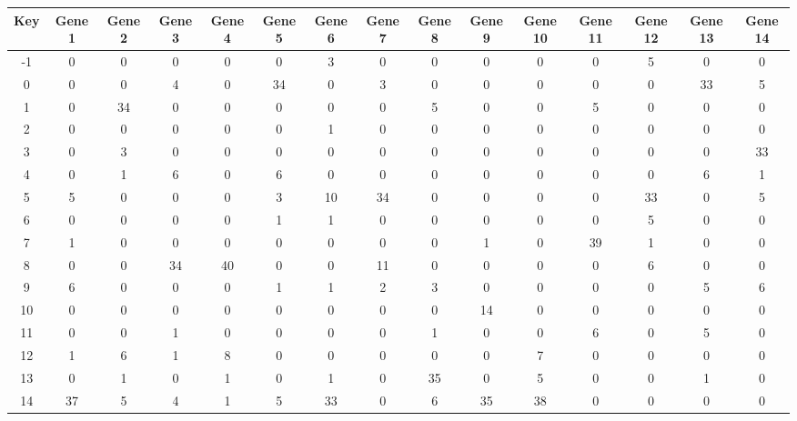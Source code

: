 \begin{tabular}{|c|c|c|c|c|c|c|c|c|c|c|c|c|c|c|}
\hline
Key & Gene 1 & Gene 2 & Gene 3 & Gene 4 & Gene 5 & Gene 6 & Gene 7 & Gene 8 & Gene 9 & Gene 10 & Gene 11 & Gene 12 & Gene 13 & Gene 14 \\
\hline
-1 & 0 & 0 & 0 & 0 & 0 & 3 & 0 & 0 & 0 & 0 & 0 & 5 & 0 & 0 \\
0 & 0 & 0 & 4 & 0 & 34 & 0 & 3 & 0 & 0 & 0 & 0 & 0 & 33 & 5 \\
1 & 0 & 34 & 0 & 0 & 0 & 0 & 0 & 5 & 0 & 0 & 5 & 0 & 0 & 0 \\
2 & 0 & 0 & 0 & 0 & 0 & 1 & 0 & 0 & 0 & 0 & 0 & 0 & 0 & 0 \\
3 & 0 & 3 & 0 & 0 & 0 & 0 & 0 & 0 & 0 & 0 & 0 & 0 & 0 & 33 \\
4 & 0 & 1 & 6 & 0 & 6 & 0 & 0 & 0 & 0 & 0 & 0 & 0 & 6 & 1 \\
5 & 5 & 0 & 0 & 0 & 3 & 10 & 34 & 0 & 0 & 0 & 0 & 33 & 0 & 5 \\
6 & 0 & 0 & 0 & 0 & 1 & 1 & 0 & 0 & 0 & 0 & 0 & 5 & 0 & 0 \\
7 & 1 & 0 & 0 & 0 & 0 & 0 & 0 & 0 & 1 & 0 & 39 & 1 & 0 & 0 \\
8 & 0 & 0 & 34 & 40 & 0 & 0 & 11 & 0 & 0 & 0 & 0 & 6 & 0 & 0 \\
9 & 6 & 0 & 0 & 0 & 1 & 1 & 2 & 3 & 0 & 0 & 0 & 0 & 5 & 6 \\
10 & 0 & 0 & 0 & 0 & 0 & 0 & 0 & 0 & 14 & 0 & 0 & 0 & 0 & 0 \\
11 & 0 & 0 & 1 & 0 & 0 & 0 & 0 & 1 & 0 & 0 & 6 & 0 & 5 & 0 \\
12 & 1 & 6 & 1 & 8 & 0 & 0 & 0 & 0 & 0 & 7 & 0 & 0 & 0 & 0 \\
13 & 0 & 1 & 0 & 1 & 0 & 1 & 0 & 35 & 0 & 5 & 0 & 0 & 1 & 0 \\
14 & 37 & 5 & 4 & 1 & 5 & 33 & 0 & 6 & 35 & 38 & 0 & 0 & 0 & 0 \\
\hline
\end{tabular}